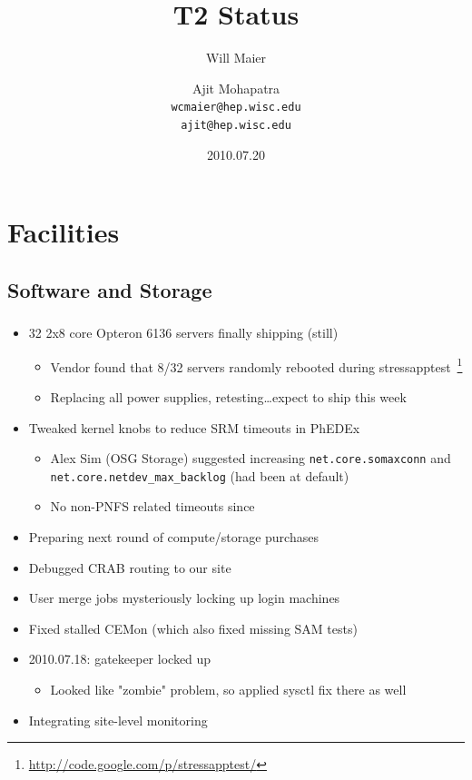 \documentclass{beamer}
\title{T2 Status}
\author[Maier, Mohapatra]{
    Will Maier \and Ajit Mohapatra\\
    {\tt wcmaier@hep.wisc.edu}\\
    {\tt ajit@hep.wisc.edu}}
\institute[Wisconsin]{University of Wisconsin - High Energy Physics}
\date{2010.07.20}
\begin{document}
\begin{frame}
    \titlepage
\end{frame}


\section{Facilities}
\subsection{Software and Storage}
\begin{frame}
\frametitle{}

\begin{itemize}
	\item 32 2x8 core Opteron 6136 servers finally shipping (still)
	\begin{itemize}
		\item Vendor found that 8/32 servers randomly rebooted during stressapptest~\footnote{\url{http://code.google.com/p/stressapptest/}}
		\item Replacing all power supplies, retesting\ldots{}expect to ship this week
	\end{itemize}
	\item Tweaked kernel knobs to reduce SRM timeouts in PhEDEx
	\begin{itemize}
		\item Alex Sim (OSG Storage) suggested increasing {\tt net.core.somaxconn} and {\tt net.core.netdev\_max\_backlog} (had been at default)
		\item No non-PNFS related timeouts since
	\end{itemize}
	\item Preparing next round of compute/storage purchases
	\item Debugged CRAB routing to our site
	\item User merge jobs mysteriously locking up login machines
	\item Fixed stalled CEMon (which also fixed missing SAM tests)
	\item 2010.07.18: gatekeeper locked up
	\begin{itemize}
		\item Looked like "zombie" problem, so applied sysctl fix there as well
	\end{itemize}
	\item Integrating site-level monitoring
\end{itemize}
\end{frame}
\end{document}
